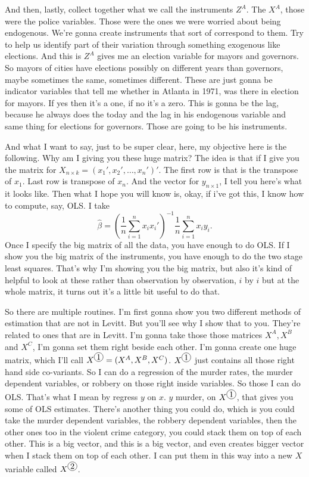 \documentclass[11pt,a4paper]{amsart}
\theoremstyle{plain}
\theoremstyle{definition}
\newcommand*\circled[1]{\tikz[baseline=(char.base)]{
		\node[shape=circle,draw,inner sep=1pt] (char) {#1};}} %
\begin{document}
			And then, lastly, collect together what we call the instruments $Z^{A}$. The $X^{A}$, those were the police variables. Those were the ones we were worried about being endogenous. We're gonna create instruments that sort of correspond to them. Try to help us identify part of their variation through something exogenous like elections. And this is $Z^{A}$ gives me an election variable for mayors and governors.  So mayors of cities have elections possibly on different years than governors, maybe sometimes the same, sometimes different. These are just gonna be indicator variables that tell me whether in Atlanta in 1971, was there in election for mayors. If yes then it's a one, if no it's a zero. This is gonna be the lag, because he always does the today and the lag in his endogenous variable and same thing for elections for governors. Those are going to be his instruments. \par 
			And what I want to say, just to be super clear, here, my objective here is the following. Why am I giving you these huge matrix? The idea is that if I give you the matrix for $X_{n \times k} = (x_{1}', x_{2}', \dots, x_{n}')'$. The first row is that is the transpose of $x_{1}$. Last row is transpose of $x_{n}$. And the vector for $y_{n \times 1}$, I tell you here's what it looks like. Then what I hope you will know is, okay, if i've got this, I know how to compute, say, OLS. I take
			\[	\hat{\beta} = (\frac{1}{n}\sum_{i=1}^{n}x_{i}x_{i}')^{-1} \frac{1}{n}\sum_{i=1}^{n}x_{i}y_{i}.	\]
			Once I specify the big matrix of all the data, you have enough to do OLS. If I show you the big matrix of the instruments, you have enough to do the two stage least squares. That's why I'm showing you the big matrix, but also it's kind of helpful to look at these rather than observation by observation, $i$ by $i$ but at the whole matrix, it turns out it's a little bit useful to do that.  \par 
			 So there are multiple routines. I'm first gonna show you two different methods of estimation that are not in Levitt. But you'll see why I show that to you. They're related to ones that are in Levitt. I'm gonna take those those matrices $X^{A}, X^{B}$ and $X^{C}$, I'm gonna set them right beside each other. I'm gonna create one huge matrix, which I'll call $X^{\circled{1}} = (X^{A}, X^{B}, X^{C})$. $X^{\circled{1}}$ just contains all those right hand side co-variants. So I can do a regression of the murder rates, the murder dependent variables, or robbery on those right inside variables.  So those I can do OLS. That's what I mean by regress $y$ on $x$. $y$ murder, on $X^{\circled{1}}$, that gives you some of OLS estimates. There's another thing you could do, which is you could take the murder dependent variables, the robbery dependent variables, then the other ones too in the violent crime category, you could stack them on top of each other. This is a big vector, and this is a big vector, and even creates bigger vector when I stack them on top of each other. I can put them in this way into a new $X$ variable called $X^{\circled{2}}$. 
\end{document}

